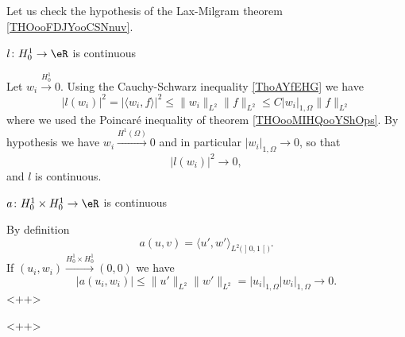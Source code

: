 \begin{example}
    Let us check the hypothesis of the Lax-Milgram theorem \ref{THOooFDJYooCSNnuv}.

    \begin{subproof}
        \item[\( l\colon H_0^1\to \eR\) is continuous]
    
            Let \( w_i\stackrel{H_0^1}{\longrightarrow}0\). Using the Cauchy-Schwarz inequality \ref{ThoAYfEHG} we have
            \begin{equation}
                | l(w_i) |^2=| \langle w_i, f\rangle  |^2\leq\| w_i \|_{L^2}\| f \|_{L^2}\leq C| w_i |_{1,\Omega}\| f \|_{L^2}
            \end{equation}
            where we used the Poincaré inequality of theorem \ref{THOooMIHQooYShOps}. By hypothesis we have \( w_i\stackrel{H^1(\Omega)}{\longrightarrow}0\) and in particular \( | w_i |_{1,\Omega}\to 0\), so that
            \begin{equation}
                | l(w_i) |^2\to 0,
            \end{equation}
            and \( l\) is continuous.

        \item[\( a\colon H_0^1\times H_0^1\to \eR\) is continuous]

            By definition
            \begin{equation}
                a(u,v)=\langle u', w'\rangle_{L^2\big( \mathopen] 0 , 1 \mathclose[ \big) }.
            \end{equation}
            If \( (u_i,w_i)\stackrel{H_0^1\times H_0^1}{\longrightarrow}(0,0)\) we have
            \begin{equation}
                | a(u_i,w_i) |\leq \| u' \|_{L^2}\| w' \|_{L^2}=| u_i|_{1,\Omega}| w_i |_{1,\Omega}\to 0.
            \end{equation}
            <++>

    \end{subproof}
    <++>
        
\end{example}

